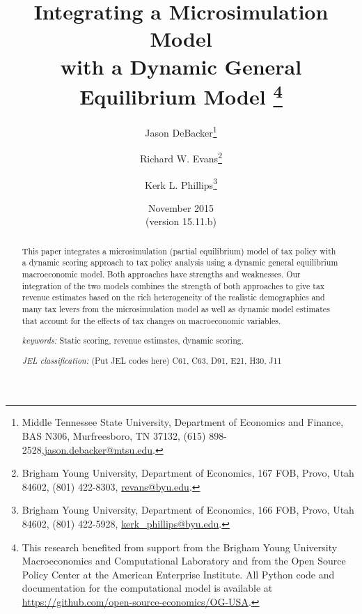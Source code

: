 \documentclass[letterpaper,12pt]{article}
\theoremstyle{definition}
\begin{document}
\begin{titlepage}
\title{Integrating a Microsimulation Model \\
       with a Dynamic General Equilibrium Model
       \thanks{This research benefited from support from the Brigham Young University Macroeconomics and Computational Laboratory and from the Open Source Policy Center at the American Enterprise Institute. All Python code and documentation for the computational model is available at \href{https://github.com/open-source-economics/OG-USA}{https://github.com/open-source-economics/OG-USA}.}
       }
\author{
  Jason DeBacker\footnote{Middle Tennessee State University, Department of Economics and Finance, BAS N306, Murfreesboro, TN 37132, (615) 898-2528,\href{mailto:jason.debacker@mtsu.edu}{jason.debacker@mtsu.edu}.} \\[-2pt]
  \and
  Richard W. Evans\footnote{Brigham Young University, Department of Economics, 167 FOB, Provo, Utah 84602, (801) 422-8303, \href{mailto:revans@byu.edu}{revans@byu.edu}.} \\[-2pt]
  \and
  Kerk L. Phillips\footnote{Brigham Young University, Department of Economics, 166 FOB, Provo, Utah 84602, (801) 422-5928, \href{mailto:kerk_phillips@byu.edu}{kerk\_phillips@byu.edu}.}}
\date{November 2015 \\
  \scriptsize{(version 15.11.b)}}
\maketitle
\vspace{-9mm}
\begin{abstract}
\small{This paper integrates a microsimulation (partial equilibrium) model of tax policy with a dynamic scoring approach to tax policy analysis using a dynamic general equilibrium macroeconomic model. Both approaches have strengths and weaknesses. Our integration of the two models combines the strength of both approaches to give tax revenue estimates based on the rich heterogeneity of the realistic demographics and many tax levers from the microsimulation model as well as dynamic model estimates that account for the effects of tax changes on macroeconomic variables.

\vspace{3mm}

\noindent\textit{keywords:}\: Static scoring, revenue estimates, dynamic scoring.

\vspace{3mm}

\noindent\textit{JEL classification:} (Put JEL codes here) C61, C63, D91, E21, H30, J11}
\end{abstract}
\thispagestyle{empty}
\end{titlepage}
\end{document}
